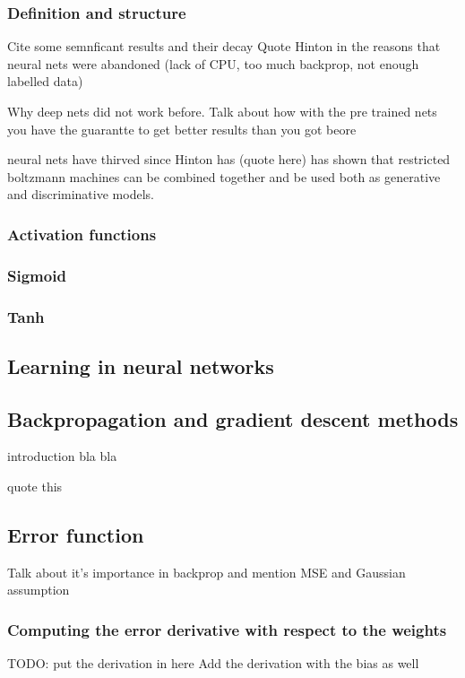 \documentclass[11pt, fleqn, twoside]{article}
\begin{document}
\subsubsection {Definition and structure}

 Cite some semnficant results and their decay
 Quote Hinton in the reasons that neural nets were abandoned (lack of CPU, too much backprop, not enough labelled data)

 Why deep nets did not work before. Talk about how with the pre trained nets you have the guarantte to get better results
  than you got beore

 neural nets have thirved since Hinton has (quote here) has shown that restricted boltzmann machines can be combined together and be used both as generative and discriminative models.

\subsubsection{Activation functions}

\subsubsection{Sigmoid}

\subsubsection{Tanh}

\subsection{Learning in neural networks}

\subsection{Backpropagation and gradient descent methods}
  introduction bla bla

  quote this \cite{LeCun1998}

\subsection{Error function}
  Talk about it's importance in backprop and mention MSE and Gaussian assumption

\subsubsection {Computing the error derivative with respect to the weights}
  TODO: put the derivation in here
  Add the derivation with the  bias as well
\end{document}
